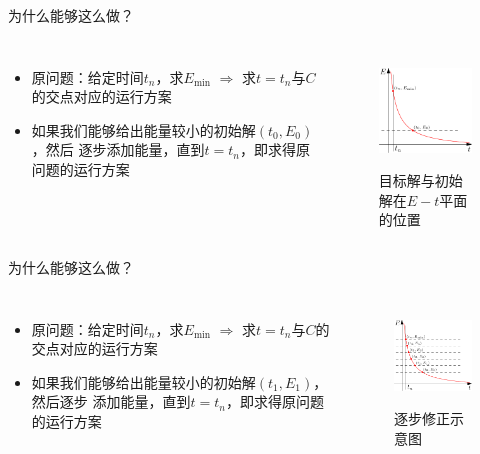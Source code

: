 \documentclass{beamer}
\begin{document}
\begin{frame}{为什么能够这么做？}
    \begin{columns}[c]
        \column{8cm}
            \begin{itemize}
              \item<1-> 原问题：给定时间$t_n$，求$E_{\min}$
                  $\Longrightarrow$ 求$t = t_n$与$C$的交点对应的运行方案
              \item<2-> 如果我们能够给出能量较小的初始解$(t_0,E_0)$，然后
                  逐步添加能量，直到$t = t_n$，即求得原问题的运行方案
            \end{itemize}
        \column{5cm}
            \begin{figure}
              \centering
              \includegraphics[width=4.5cm]{fig/fig2/fig2.pdf}\\
              \caption{目标解与初始解在$E-t$平面的位置}
            \end{figure}

    \end{columns}
\end{frame}

\begin{frame}{为什么能够这么做？}
    \begin{columns}[c]
        \column{8cm}
            \begin{itemize}
              \item 原问题：给定时间$t_n$，求$E_{\min}$ $\Longrightarrow$
                  求$t = t_n$与$C$的交点对应的运行方案
              \item 如果我们能够给出能量较小的初始解$(t_1,E_1)$，然后逐步
                  添加能量，直到$t = t_n$，即求得原问题的运行方案
            \end{itemize}
        \column{5cm}
        \begin{figure}
          \centering
          \includegraphics[width=4.5cm]{fig/fig3/fig3.pdf}\\
          \caption{逐步修正示意图}
        \end{figure}


    \end{columns}
\end{frame}
\end{document}
